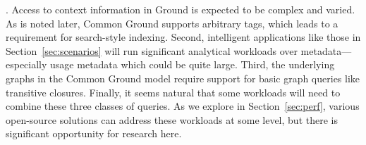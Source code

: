\documentclass{sig-alternate}
\begin{document}



.  Access to context information in Ground is expected to be complex and varied. As is noted later, Common Ground supports arbitrary tags, which leads to a requirement for search-style indexing.
Second, intelligent applications like those in Section~\ref{sec:scenarios} will run significant analytical workloads over metadata---especially usage metadata which could be quite large.  
Third, the underlying graphs in the Common Ground model require support for basic graph queries like transitive closures. 
Finally, it seems natural that some workloads will need to combine these three classes of queries.
As we explore in Section~\ref{sec:perf}, various open-source solutions can address these workloads at some level, but there is significant opportunity for research here.
\end{document}
